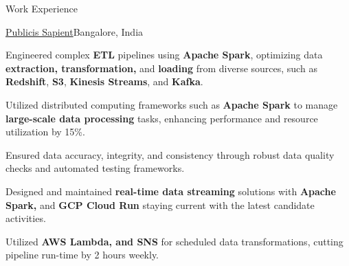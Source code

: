 \documentclass{resume} %
\begin{document}
\begin{rSection}{Work Experience}
\begin{rSubsection}{\href{https://www.publicissapient.com/}{Publicis Sapient}}{Bangalore, India}{}{}
    \item Engineered complex \textbf{ETL} pipelines using \textbf{Apache Spark}, optimizing data \textbf{extraction, transformation, }and\textbf{ loading} from diverse sources, such as \textbf{Redshift}, \textbf{S3}, \textbf{Kinesis Streams}, and \textbf{Kafka}.
    \item Utilized distributed computing frameworks such as \textbf{Apache Spark} to manage \textbf{large-scale data processing} tasks, enhancing performance and resource utilization by 15\%.
    \item Ensured data accuracy, integrity, and consistency through robust data quality checks and automated testing frameworks.
    \item Designed and maintained \textbf{real-time data streaming} solutions with \textbf{Apache Spark, }and\textbf{ GCP Cloud Run} staying current with the latest candidate activities.
    \item Utilized \textbf{AWS Lambda, and SNS} for scheduled data transformations, cutting pipeline run-time by 2 hours weekly.
\end{rSubsection}


\end{rSection}

\end{document}
